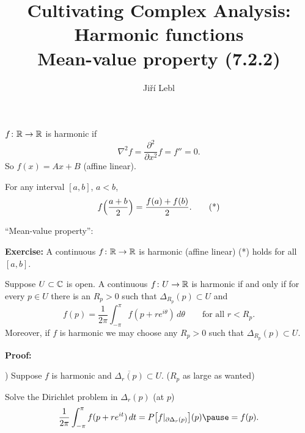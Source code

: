 \documentclass[10pt,aspectratio=169]{beamer}
\author{Ji\v{r}\'i Lebl}
\institute[OSU]{%
Departemento pri Matematiko de Oklahoma {\^S}tata Universitato}
\title{Cultivating Complex Analysis:\\%
Harmonic functions\\%
Mean-value property (7.2.2)}
\date{}
\begin{document}
\begin{frame}
\titlepage
\end{frame}

\begin{frame}
$f \colon {\mathbb{R}} \to {\mathbb{R}}$ is harmonic if
\pause
\[
\nabla^2 f = 
\frac{\partial^2}{\partial x^2} f = f'' = 0 .
\]
\pause
So $f(x) = Ax+B$ (affine linear).

\medskip
\pause

For any interval $[a,b]$, $a < b$,
\[
f\Bigl(\frac{a+b}{2}\Bigr) = \frac{f(a)+f(b)}{2} . \tag{*}
\]

\medskip
\pause

``Mean-value property'':

\medskip

\textbf{Exercise:} A continuous $f \colon {\mathbb{R}} \to {\mathbb{R}}$ is harmonic (affine linear) \wiffif (*) holds
for all $[a,b]$.
\end{frame}

\begin{frame}
\begin{theorem}
Suppose $U \subset {\mathbb{C}}$ is open.
A continuous 
$f \colon U \to {\mathbb{R}}$
is harmonic if and only if 
for every $p \in U$ there is an $R_p > 0$ such that
$\Delta_{R_p}(p) \subset U$ and
\begin{equation*}
f(p) = \frac{1}{2\pi} \int_{-\pi}^{\pi} f(p+re^{i\theta})\, d\theta
\qquad \text{for all } r < R_p .
\end{equation*}
Moreover, if $f$ is harmonic we may choose any $R_p > 0$ such that
$\Delta_{R_p}(p) \subset U$.
\end{theorem}

\pause
\textbf{Proof:}

\thus) \quad \pause
Suppose $f$ is harmonic and $\overline{\Delta_r(p)} \subset U$. 
\pause
\quad
($R_p$ as large as wanted)

\pause
\medskip

Solve the Dirichlet problem in $\Delta_r(p)$ (at $p$)
\begin{equation*}
\frac{1}{2\pi} \int_{-\pi}^{\pi}f(p + r e^{it}) \, dt =
P\bigl[f|_{\partial \Delta_r(p)}\big](p) \pause = f(p) .
\end{equation*}

\end{frame}
\end{document}
